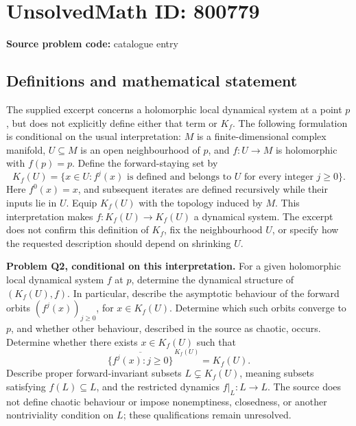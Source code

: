 \documentclass[11pt]{article}
\begin{document}
\section*{UnsolvedMath ID: 800779}
\textbf{Source problem code:} catalogue entry
\subsection{Definitions and mathematical statement}
The supplied excerpt concerns a holomorphic local dynamical system at a point \(p\), but does not explicitly define either that term or \(K_f\). The following formulation is conditional on the usual interpretation: \(M\) is a finite-dimensional complex manifold, \(U\subseteq M\) is an open neighbourhood of \(p\), and \(f\colon U\to M\) is holomorphic with \(f(p)=p\). Define the forward-staying set by
\[
K_f(U)=\{x\in U: f^j(x)\text{ is defined and belongs to }U\text{ for every integer }j\geq 0\}.
\]
Here \(f^0(x)=x\), and subsequent iterates are defined recursively while their inputs lie in \(U\). Equip \(K_f(U)\) with the topology induced by \(M\). This interpretation makes \(f\colon K_f(U)\to K_f(U)\) a dynamical system. The excerpt does not confirm this definition of \(K_f\), fix the neighbourhood \(U\), or specify how the requested description should depend on shrinking \(U\).

\textbf{Problem Q2, conditional on this interpretation.} For a given holomorphic local dynamical system \(f\) at \(p\), determine the dynamical structure of \((K_f(U),f)\). In particular, describe the asymptotic behaviour of the forward orbits \((f^j(x))_{j\geq 0}\), for \(x\in K_f(U)\). Determine which such orbits converge to \(p\), and whether other behaviour, described in the source as chaotic, occurs. Determine whether there exists \(x\in K_f(U)\) such that
\[
\overline{\{f^j(x):j\geq 0\}}^{\,K_f(U)}=K_f(U).
\]
Describe proper forward-invariant subsets \(L\subsetneq K_f(U)\), meaning subsets satisfying \(f(L)\subseteq L\), and the restricted dynamics \(f|_L\colon L\to L\). The source does not define chaotic behaviour or impose nonemptiness, closedness, or another nontriviality condition on \(L\); these qualifications remain unresolved.
\end{document}
